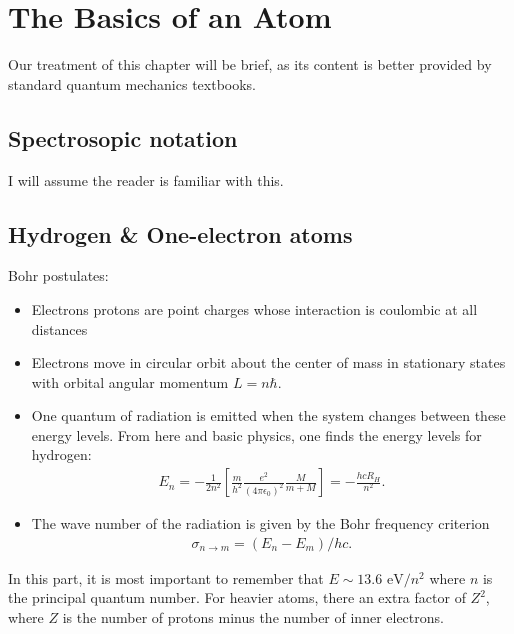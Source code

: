 \documentclass{book}
\theoremstyle{definition}
\newcommand{\f}[2]{\frac{#1}{#2}}
\newcommand{\lb}{\left[}
\newcommand{\rb}{\right]}
\begin{document}


\chapter{The Basics of an Atom}


Our treatment of this chapter will be brief, as its content is better provided by standard quantum mechanics textbooks. 


\section{Spectrosopic notation}

I will assume the reader is familiar with this. 



\section{Hydrogen \& One-electron atoms}

Bohr postulates: 
\begin{itemize}
	\item Electrons protons are point charges whose interaction is coulombic at all distances
	\item Electrons move in circular orbit about the center of mass in stationary states with orbital angular momentum $L = n\hbar$.
	\item One quantum of radiation is emitted when the system changes between these energy levels. From here and basic physics, one finds the energy levels for hydrogen:
	\begin{align*}
		E_n = -\f{1}{2n^2}\lb \f{m}{h^2} \f{e^2}{(4\pi \epsilon_0)^2} \f{M}{m+M} \rb = -\f{hcR_H}{n^2}.
	\end{align*}
	\item The wave number of the radiation is given by the Bohr frequency criterion
	\begin{align*}
		\sigma_{n\to m} = (E_n - E_m)/hc.
	\end{align*}
\end{itemize}

In this part, it is most important to remember that $E \sim 13.6 \text{ eV}/n^2 $ where $n$ is the principal quantum number. For heavier atoms, there an extra factor of $Z^2$, where $Z$ is the number of protons minus the number of inner electrons.\\
\end{document}
